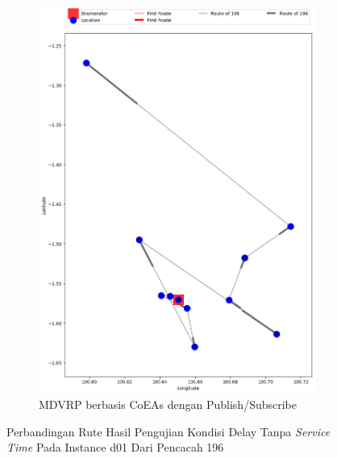 \begin{figure}[H]\ContinuedFloat
	\centering
	\begin{subfigure}[t]{\textwidth}
		\centering
		\includegraphics[width=\textwidth]{Resources/Images/delayed_1/real_m15_n100_delayed_1_196_pubsub_coes}
		\caption{MDVRP berbasis CoEAs dengan Publish/Subscribe}
		\label{fig:real_m15_n100_delayed_1_196_pubsub_coes}
	\end{subfigure}
	\caption{Perbandingan Rute Hasil Pengujian Kondisi Delay Tanpa \textit{Service Time} Pada Instance d01 Dari Pencacah 196}
	\label{fig:real_m15_n100_delayed_1_196_contd}
\end{figure}


